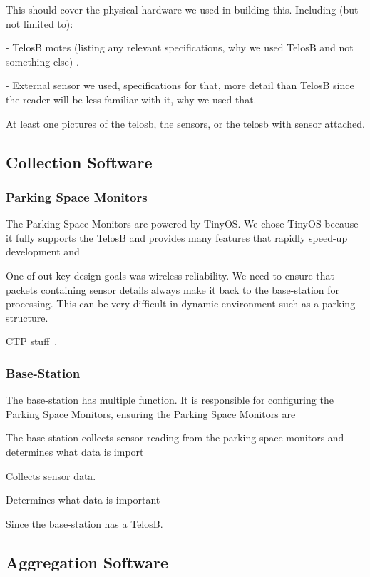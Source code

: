 \documentclass{acm_proc}
\begin{document}
This should cover the physical hardware we used in building this.
Including (but not limited to):

- TelosB motes (listing any relevant specifications, why we used TelosB
 and not something else) \cite{xbow:telosb-datasheet}.

- External sensor we used, specifications for that, more detail than
 TelosB since the reader will be less familiar with it, why we used that.

At least one pictures of the telosb, the sensors, or the telosb with sensor
attached.

\subsection{Collection Software}

\subsubsection{Parking Space Monitors}

The Parking Space Monitors are powered by TinyOS.  We chose TinyOS because it fully supports the TelosB and provides many features that rapidly speed-up development and 

One of out key design goals was wireless reliability.  We need to ensure that packets containing sensor details always make it back to the base-station for processing.  This can be very difficult in dynamic environment such as a parking structure.  


CTP stuff~\cite{tep119:collection}.

\subsubsection{Base-Station}

The base-station has multiple function.  It is responsible for configuring the Parking Space Monitors, ensuring the Parking Space Monitors are

The base station collects sensor reading from the parking space monitors and determines what data is import

Collects sensor data.

Determines what data is important

Since the base-station has a TelosB.


\subsection{Aggregation Software}
\end{document}
